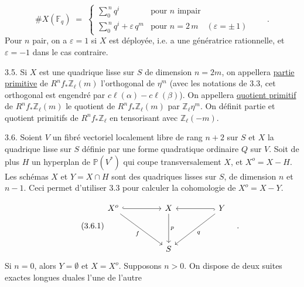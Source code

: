 \begin{equation*}
\# X(\mathbb{F}_q) \;=\; \left\{ \begin{array}{ll} \displaystyle\sum_{0}^{\,n} q^{i} & \mbox{pour } n \mbox{ impair} \\[3ex] \displaystyle\sum_{0}^{\,n} q^{i} + \varepsilon\, q^{m} & \mbox{pour } n = 2\,m \quad (\varepsilon = \pm\, 1) \end{array} \right. \qquad .
\end{equation*}
Pour $n$ pair, on a $\varepsilon = 1$ si $X$ est déployée, i.e. \quad a une génératrice rationnelle, et $\varepsilon = -1$ dans le cas contraire.

3.5. Si $X$ est une quadrique lisse sur $S$ de dimension $n = 2m$, on appellera \underline{partie primitive} de $R^{n}f_{*}\mathbb{Z}_{\ell}(m)$ l'orthogonal de $\eta^{m}$ (avec les notations de 3.3, cet orthogonal est engendré par $c\ell(\alpha)-c\ell(\beta)$). On appellera \underline{quotient primitif} de $R^{n}f_{*}\mathbb{Z}_{\ell}(m)$ le quotient de $R^{n}f_{*}\mathbb{Z}_{\ell}(m)$ par $\mathbb{Z}_{\ell}\eta^{m}$. On définit partie et quotient primitifs de $R^{n}f_{*}\mathbb{Z}_{\ell}$ en tensorisant avec $\mathbb{Z}_{\ell}(-m)$.

3.6. Soient $V$ un fibré vectoriel localement libre de rang $n + 2$ sur $S$ et $X$ la quadrique lisse sur $S$ définie par une forme quadratique ordinaire $Q$ sur $V$. Soit de plus $H$ un hyperplan de $\mathbb{P}(V^{*})$ qui coupe transversalement $X$, et $X^{o} = X - H$. Les schémas $X$ et $Y = X \cap H$ sont des quadriques lisses sur $S$, de dimension $n$ et $n - 1$. Ceci permet d'utiliser 3.3 pour calculer la cohomologie de $X^{o} = X - Y$.



\begin{equation}\tag{3.6.1}
\begin{tikzcd}[column sep=huge, row sep=huge]
X^{o} \arrow[r, hook] \arrow[rd, "f"'] & X \arrow[d, "p"] & Y \arrow[l, hook] \arrow[ld, "q"] \\
 {} & S &
{} \end{tikzcd}\quad .
\end{equation}
Si $n = 0$, alors $Y = \emptyset$ et $X = X^{o}$. Supposons $n > 0$. On dispose de deux suites exactes longues duales l'une de l'autre

